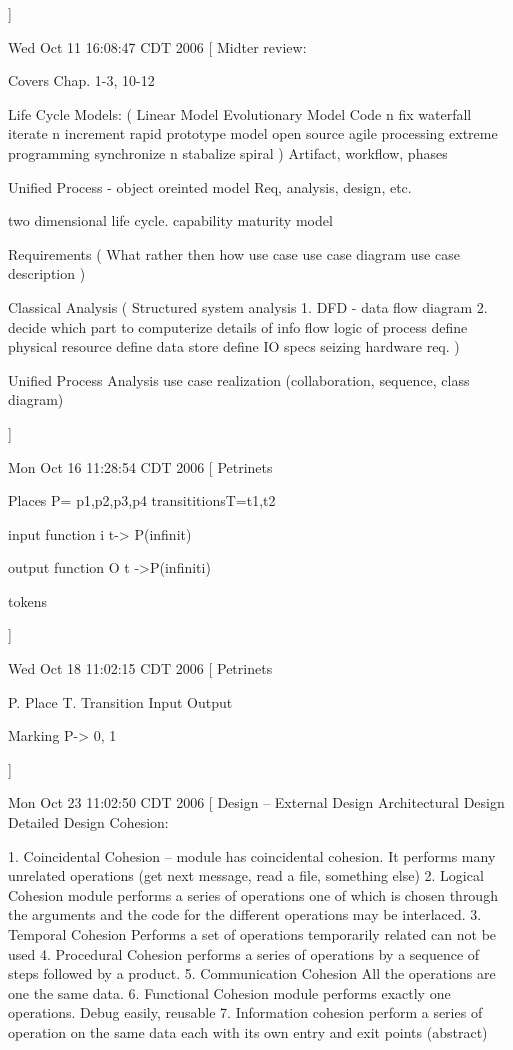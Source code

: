 \documentclass[a4paper]{article}
\begin{document}
{ 

]


Wed Oct 11 16:08:47 CDT 2006
[
  Midter review:

Covers Chap. 1-3, 10-12

Life Cycle Models:
  (
   Linear Model
   Evolutionary Model
   Code n fix
   waterfall
   iterate n increment
   rapid prototype model
   open source 
   agile processing
   extreme programming
   synchronize n stabalize
   spiral 
   )
Artifact, workflow, phases

Unified Process - object oreinted model
  Req, analysis, design, etc.

two dimensional life cycle.
capability maturity model

Requirements
 (
  What rather then how
    use case
	use case diagram
	use case description
 )

Classical Analysis
 (
  Structured system analysis
   1. DFD - data flow diagram
   2. decide which part to computerize
   details of info flow
   logic of process
   define physical resource
   define data store
   define IO specs
   seizing 
   hardware req.
  )

Unified Process Analysis
   use case realization (collaboration, sequence, class diagram)

]


Mon Oct 16 11:28:54 CDT 2006
[
  Petrinets

  Places P= {p1,p2,p3,p4}
  transititionsT={t1,t2}

  input function i t-> P(infinit)
  
  output function O t ->P(infiniti)

  tokens


]


Wed Oct 18 11:02:15 CDT 2006
[
   Petrinets

P.   Place
T.   Transition
   Input
   Output

   Marking  P-> { 0, 1 }

]


Mon Oct 23 11:02:50 CDT 2006
[
  Design -- External Design
  		    Architectural Design
			Detailed Design 
  Cohesion:

     1. Coincidental Cohesion   -- module has coincidental cohesion.
	 		It performs many unrelated operations  (get next message, read a file, something else)
	2. Logical Cohesion
		module performs a series of operations one of which is chosen through the arguments and the code for the different operations may be interlaced.
	3.  Temporal Cohesion
			Performs a set of operations temporarily related 
			can not be used
	4.  Procedural Cohesion
			performs a series of operations by a sequence of steps followed by a product.
	5.  Communication Cohesion
			All the operations are one the same data.
	6.  Functional Cohesion
	 		module performs exactly one operations.  Debug easily, reusable
	7.  Information cohesion
			perform a series of operation on the same data
			each with its own entry and exit points (abstract)

}
\end{document}
